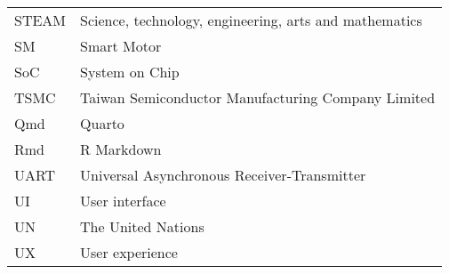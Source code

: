 {\begin{longtable}[h]{@{}p{} @{}p{}@{}}
STEAM           & Science, technology, engineering, arts and mathematics \\
SM              & Smart Motor \\
SoC             & System on Chip \\
TSMC            & Taiwan Semiconductor Manufacturing Company Limited \\
Qmd             & Quarto \\
Rmd             & R Markdown \\
UART            & Universal Asynchronous Receiver-Transmitter \\
UI              & User interface \\
UN              & The United Nations \\
UX              & User experience \\

\end{longtable}
}

